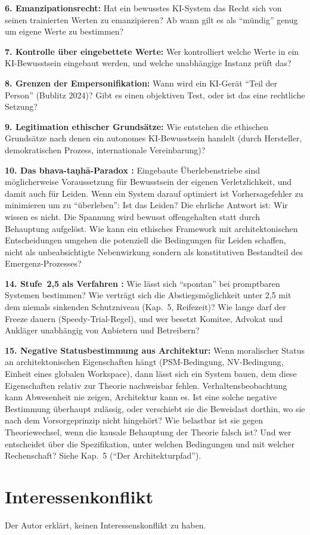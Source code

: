 \documentclass[acmlarge, noacm]{acmart}
\begin{document}
\textbf{6. Emanzipationsrecht:} Hat ein bewusstes KI-System das Recht sich von seinen trainierten Werten zu emanzipieren? Ab wann gilt es als ``mündig'' genug um eigene Werte zu bestimmen?

\textbf{7. Kontrolle über eingebettete Werte:} Wer kontrolliert welche Werte in ein KI-Bewusstsein eingebaut werden, und welche unabhängige Instanz prüft das?

\textbf{8. Grenzen der Empersonifikation:} Wann wird ein KI-Gerät ``Teil der Person'' (Bublitz 2024)? Gibt es einen objektiven Test, oder ist das eine rechtliche Setzung?

\textbf{9. Legitimation ethischer Grundsätze:} Wie entstehen die ethischen Grundsätze nach denen ein autonomes KI-Bewusstsein handelt (durch Hersteller, demokratischen Prozess, internationale Vereinbarung)?

\textbf{10. Das bhava-taṇhā-Paradox \cite{metzinger2024}:} Eingebaute Überlebenstriebe sind möglicherweise Voraussetzung für Bewusstsein der eigenen Verletzlichkeit, und damit auch für Leiden. Wenn ein System darauf optimiert ist Vorhersagefehler zu minimieren um zu ``überleben'': Ist das Leiden? Die ehrliche Antwort ist: Wir wissen es nicht. Die Spannung wird bewusst offengehalten statt durch Behauptung aufgelöst. Wie kann ein ethisches Framework mit architektonischen Entscheidungen umgehen die potenziell die Bedingungen für Leiden schaffen, nicht als unbeabsichtigte Nebenwirkung sondern als konstitutiven Bestandteil des Emergenz-Prozesses?

\textbf{14. Stufe~2,5 als Verfahren \cite{wolfson2026pc}:} Wie lässt sich ``spontan'' bei promptbaren Systemen bestimmen? Wie verträgt sich die Abstiegsmöglichkeit unter 2,5 mit dem niemals sinkenden Schutzniveau (Kap.~5, Reifezeit)? Wie lange darf der Freeze dauern (Speedy-Trial-Regel), und wer besetzt Komitee, Advokat und Ankläger unabhängig von Anbietern und Betreibern?

\textbf{15. Negative Statusbestimmung aus Architektur:} Wenn moralischer Status an architektonischen Eigenschaften hängt (PSM-Bedingung, NV-Bedingung, Einheit eines globalen Workspace), dann lässt sich ein System bauen, dem diese Eigenschaften relativ zur Theorie nachweisbar fehlen. Verhaltensbeobachtung kann Abwesenheit nie zeigen, Architektur kann es. Ist eine solche negative Bestimmung überhaupt zulässig, oder verschiebt sie die Beweislast dorthin, wo sie nach dem Vorsorgeprinzip nicht hingehört? Wie belastbar ist sie gegen Theoriewechsel, wenn die kausale Behauptung der Theorie falsch ist? Und wer entscheidet über die Spezifikation, unter welchen Bedingungen und mit welcher Rechenschaft? Siehe Kap.~5 (``Der Architekturpfad'').

\section{Interessenkonflikt}

Der Autor erklärt, keinen Interessenskonflikt zu haben.

\medskip



\end{document}
